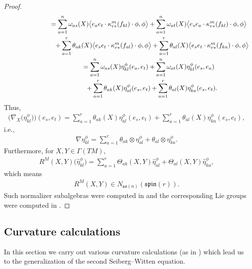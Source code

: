 \documentclass[pdftex]{sigma}
\numberwithin{equation}{section}
\begin{document}
\begin{proof}
\begin{gather*}
\hphantom{\nabla_X \big(\eta_{kl}^\phi(e_s,e_t)\big)}{}
 = \sum_{a=1}^n\omega_{as}(X)\big\langle e_a e_t\cdot \kappa_{r*}^m(f_{kl}) \cdot \phi,\phi \big\rangle
+\sum_{a=1}^n\omega_{at}(X)\big\langle e_s e_a\cdot \kappa_{r*}^m(f_{kl}) \cdot \phi,\phi \big\rangle \\
\hphantom{\nabla_X \big(\eta_{kl}^\phi(e_s,e_t)\big)=}{}
 +\sum_{a=1}^r\theta_{ak}(X)\big\langle e_s e_t\cdot \kappa_{r*}^m(f_{al}) \cdot \phi,\phi \big\rangle
+\sum_{a=1}^r\theta_{al}(X)\big\langle e_s e_t\cdot \kappa_{r*}^m(f_{ka}) \cdot \phi,\phi \big\rangle \\
\hphantom{\nabla_X \big(\eta_{kl}^\phi(e_s,e_t)\big)}{}
 = \sum_{a=1}^n\omega_{as}(X)\eta_{kl}^\phi(e_a,e_t)
+\sum_{a=1}^n\omega_{at}(X)\eta_{kl}^\phi(e_s,e_a)\\
\hphantom{\nabla_X \big(\eta_{kl}^\phi(e_s,e_t)\big)=}{}
 +\sum_{a=1}^r\theta_{ak}(X)\eta_{al}^\phi(e_s, e_t)
+\sum_{a=1}^r\theta_{al}(X)\eta_{ka}^\phi( e_s, e_t).
\end{gather*}
Thus,
\begin{gather*}
 \big(\nabla_X \big(\eta_{kl}^\phi\big)\big)(e_s,e_t)
= \sum_{a=1}^r\theta_{ak}(X)\eta_{al}^\phi(e_s, e_t)
+\sum_{a=1}^r\theta_{al}(X)\eta_{ka}^\phi( e_s, e_t),
\end{gather*}
i.e.,
\begin{gather*}
 \nabla \eta_{kl}^\phi = \sum_{a=1}^r\theta_{ak}\otimes\eta_{al}^\phi +\theta_{al}\otimes\eta_{ka}^\phi.
\end{gather*}
Furthermore, for $X,Y\in\Gamma(TM)$,
\begin{gather}
R^M(X,Y)\big(\hat\eta_{kl}^\phi\big)= \sum_{a=1}^r \Theta_{ak}(X,Y)\hat\eta_{al}^\phi+\Theta_{al}(X,Y)\hat\eta_{ka}^\phi, \label{eq: curvature identity endomorphisms}
\end{gather}
which means
\begin{gather*}R^M(X,Y)\in N_{\mathfrak{so}(n)}(\mathfrak{spin}(r)).\end{gather*}
Such normalizer subalgebras were computed in \cite{AH} and the corresponding Lie groups were computed in \cite{AGH}.
\end{proof}

\subsection{Curvature calculations}

In this section we carry out various curvature calculations (as in \cite{Moroianu-Semmelmann}) which lead us to the ge\-ne\-ralization of the second Seiberg--Witten equation.
\end{document}
